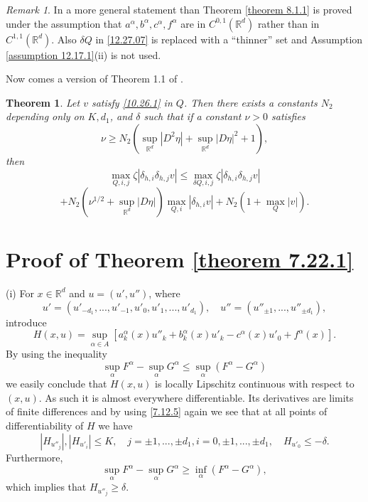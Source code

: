 \documentclass[11pt, reqno]{amsart}
\newtheorem{theorem}{Theorem}[section]
\theoremstyle{definition}
\theoremstyle{remark}
\newtheorem{remark}{Remark}[section]
\begin{document}
\begin{remark}
In \cite{Kr12.1} a more general statement  than 
Theorem \ref{theorem 8.1.1} is proved under the assumption
that $a^{\alpha},b^{\alpha},c^{\alpha},f^{\alpha}$
are in $C^{0,1}({\mathbb{R}}^{d})$ rather than in $C^{1,1}({\mathbb{R}}^{d})$.
Also $\delta Q$ in \eqref{12.27.07} is replaced with a 
``thinner'' set and Assumption  \ref{assumption 12.17.1}(ii) 
is not used.
\end{remark}

Now comes a version of Theorem 1.1 of \cite{Kr12.2}.

\begin{theorem}
                                         \label{theorem 8.1.2}
Let $v$ satisfy \eqref{10.26.1}
in $Q $.
Then there exists a  constants $N_{2}$  depending only on 
  $ K,d_{1}$,
and $\delta$   
such that if   a constant $\nu>0$ satisfies
$$
\nu\geq N_{2}  (\sup_{{\mathbb{R}}^{d}}|D^{2}\eta|
+ \sup_{{\mathbb{R}}^{d}}|D \eta|^{2}+1),
$$
then  
$$
\max_{Q,i,j}\zeta  
|\delta_{h,i}\delta_{h,j}v|\leq \max_{\delta Q,i,j}\zeta  
|\delta_{h,i}\delta_{h,j}v| 
$$
$$
+N_{2}(\nu^{1/2} +\sup_{{\mathbb{R}}^{d}}|D \eta| )
\max_{Q,i } 
|\delta_{h,i} v| + N_{2}(1+ \max_{Q}|v|).
$$
\end{theorem}

{\section{{Proof of Theorem \protect\ref{theorem 7.22.1}}}
      \setcounter{equation}{0}}
                                          \label{section 7.5.1}

(i) For $x\in{\mathbb{R}}^{d}$ and $u=(u',u'')$, where
$$
u'=(u'_{-d_{1}},...,u'_{-1},u'_{0},u'_{1},
...,u'_{d_{1}}),\quad u''=(u''_{\pm1},...,u''_{\pm d_{1}}),
$$
introduce
$$
H(x,u)=
\sup_{\alpha\in A} 
 [a_{k}^{\alpha}( x)u''_{k}
+b_{k}^{\alpha}( x)u'_{k} 
-c^{\alpha}(x)u'_{0}+f^{\alpha}( x) ].
$$
By using the inequality
\begin{equation}
                                                      \label{7.12.5}
 \sup_{\alpha}F^{\alpha}-\sup_{\alpha}G^{\alpha} \leq
\sup_{\alpha}(F^{\alpha}-G^{\alpha})
\end{equation}
we easily conclude that $H(x,u)$ is locally Lipschitz continuous with
respect to $(x,u)$. As such it is almost everywhere differentiable.
Its derivatives are limits of finite differences and by using 
\eqref{7.12.5} again we see that at all points of differentiability
of $H$ we have
$$
|H_{u''_{j}}|,|H_{u' _{i}}|\leq K,\quad j=\pm1,...,\pm d_{1},
i=0,\pm1,...,\pm d_{1},
\quad H_{u'_{0}}\leq-\delta.
$$
 Furthermore,
$$
\sup_{\alpha}F^{\alpha}-\sup_{\alpha}G^{\alpha}
\geq\inf_{\alpha}(F^{\alpha}-G^{\alpha}),
$$
which implies that $H_{u''_{j}}\geq\delta$.
\end{document}
